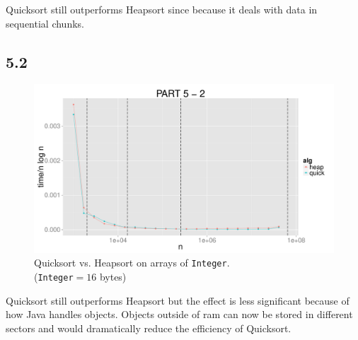 \documentclass{article}
\begin{document}
Quicksort still outperforms Heapsort since because it deals with data in 
sequential chunks.    
%
%
\subsection*{5.2}
\begin{figure}[H]
    \centering
    \includegraphics[width=
    \textwidth]{images/part5_2.pdf}
    \caption{Quicksort vs. Heapsort on arrays of \texttt{Integer}. 
    \\(\texttt{Integer}$= 16$ bytes)}
    \label{fig:awesome_image}
\end{figure}
Quicksort still outperforms Heapsort but the effect is less significant because 
of how Java handles objects. Objects outside of ram can now be stored in 
different sectors and would dramatically reduce the efficiency of Quicksort.  

\end{document}
